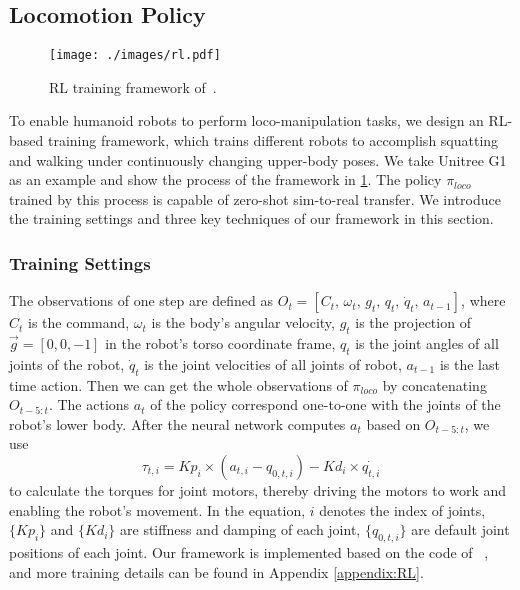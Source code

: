 \subsection{Locomotion Policy}
\label{sec:method_rl}
\begin{figure}[!ht]
  \centering
  \texttt{[image: ./images/rl.pdf]}
  \caption{RL training framework of~\ourshort.}
  \label{fig:rl}
\end{figure}
To enable humanoid robots to perform loco-manipulation tasks, we design an RL-based training framework, which trains different robots to accomplish squatting and walking under continuously changing upper-body poses. We take Unitree G1 as an example and show the process of the framework in \cref{fig:rl}. The policy $\pi_{loco}$ trained by this process is capable of zero-shot sim-to-real transfer. We introduce the training settings and three key techniques of our framework in this section.

\subsubsection{Training Settings}
The observations of one step are defined as \textbf{$O_t=[C_t,\,\omega_t,\,g_t,\,q_t,\,\dot{q}_t,\,a_{t-1}]$}, where $C_t$ is the command, $\omega_t$ is the body's angular velocity, $g_t$ is the projection of $\vec{g}=[0,0,-1]$ in the robot's torso coordinate frame, $q_t$ is the joint angles of all joints of the robot, $\dot{q}_t$ is the joint velocities of all joints of robot, $a_{t-1}$ is the last time action. Then we can get the whole observations of $\pi_{loco}$ by concatenating $O_{t-5:t}$. The actions $a_t$ of the policy correspond one-to-one with the joints of the robot's lower body. After the neural network computes $a_t$ based on $O_{t-5:t}$, we use 
\begin{equation}
\tau_{t,i} = Kp_i \times (a_{t,i}-q_{0,t,i}) - Kd_i \times \dot{q_{t,i}} 
\end{equation}
to calculate the torques for joint motors, thereby driving the motors to work and enabling the robot's movement. In the equation, $i$ denotes the index of joints, $\{Kp_i\}$ and $\{Kd_i\}$ are stiffness and damping of each joint, $\{q_{0,t,i}\}$ are default joint positions of each joint. Our framework is implemented based on the code of ~\cite{long2024hybrid,rudin2022learning}, and more training details can be found in Appendix \ref{appendix:RL}.

